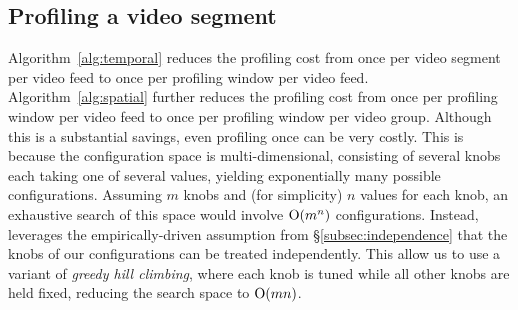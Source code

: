 

\subsection{Profiling a video segment}
\label{subsec:profile-alg}

Algorithm~\ref{alg:temporal} reduces the profiling cost from once per video segment 
per video feed to once per profiling window per video feed. Algorithm~\ref{alg:spatial} 
further reduces the profiling cost from once per profiling window per video feed to once per profiling window per video group. Although this is a substantial savings, even profiling  
once can be very costly. This is because the configuration space is
multi-dimensional, consisting of several knobs each taking one of several values,
yielding exponentially many possible configurations. Assuming $m$ knobs and (for simplicity)
$n$ values for each knob, an exhaustive search of this space would involve $\mathrm{O}(m^n)$ configurations.
Instead, \name leverages the empirically-driven assumption from \S\ref{subsec:independence} that the knobs of our \nn configurations can be treated independently. This allow us to use
a variant of {\em greedy hill climbing}, where each knob is tuned while all other knobs are held fixed, reducing the search space to $\mathrm{O}(mn)$. 


